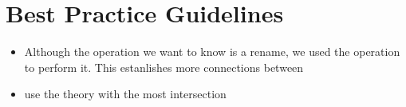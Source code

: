 \section{Best Practice Guidelines}
\begin{itemize}
    \item Although the operation we want to know is a rename, we used the  operation to perform it. This estanlishes more connections between 
    \item use the theory with the most intersection 
\end{itemize}


\begin{comment}
There are two different ways by which a user or a library builder can define a new theory; either by stating all its components or by reusing existing theories. While an end user might in some cases prefer the first approach for the formalization tasks, a library is more rich in information if it deploys the second approach. For example, defining a \group to be a \monoid with inverse gives us more information than what are its declarations, it also tell us about how it is related to \monoid. Most systems provide users with at least inclusions which enable them to include a verbatim version of one theory into the other, so the relation between \group and \monoid mentioned here can be captured. But, is this enough? 



\end{comment}